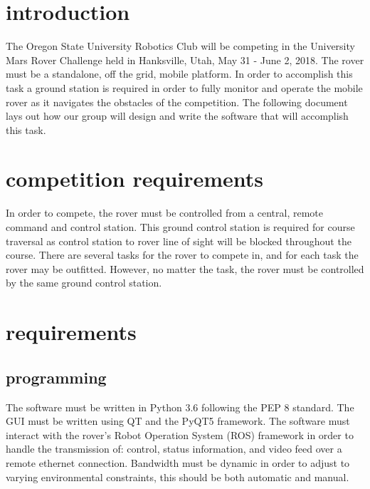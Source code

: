 \documentclass[onecolumn, draftclsnofoot, 10pt, compsoc]{IEEEtran}
\begin{document}
\section{introduction}\par
	The Oregon State University Robotics Club will be competing in the University Mars Rover Challenge held in Hanksville, Utah, May 31 - June 2, 2018.
	The rover must be a standalone, off the grid, mobile platform.
	In order to accomplish this task a ground station is required in order to fully monitor and operate the mobile rover as it navigates the obstacles of the competition.
	The following document lays out how our group will design and write the software that will accomplish this task.

\section{competition requirements}
	In order to compete, the rover must be controlled from a central, remote command and control station.
	This ground control station is required for course traversal as control station to rover line of sight will be blocked throughout the course.
	There are several tasks for the rover to compete in, and for each task the rover may be outfitted.
	However, no matter the task, the rover must be controlled by the same ground control station.

\section{requirements}
\subsection{programming}
	The software must be written in Python 3.6 following the PEP 8 standard.
	The GUI must be written using QT and the PyQT5 framework.
	The software must interact with the rover's Robot Operation System (ROS) framework in order to handle the transmission of: control, status information, and video feed over a remote ethernet connection.
	Bandwidth must be dynamic in order to adjust to varying environmental constraints, this should be both automatic and manual.
\end{document}
